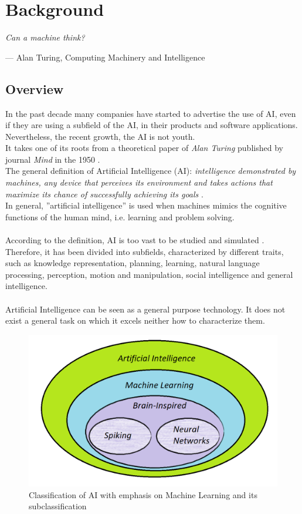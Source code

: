 \chapter{Background}

\epigraph{ \textit{Can a machine think?}}{--- \textup{Alan Turing}, Computing Machinery and Intelligence}

\section{Overview}
In the past decade many companies have started to advertise the use of AI, even if they are using a subfield of the AI, in their products and software applications. Nevertheless, the recent growth,
the AI is not youth.\\ It takes one of its roots from a theoretical paper of \textit{Alan Turing} published by journal \textit{Mind} in the 1950 \cite{paper:36}.\\

The general definition of Artificial Intelligence (AI): \textit{intelligence demonstrated by machines, any device that perceives its environment and takes actions that maximize its chance of successfully achieving its goals}    \cite{book:1}.\\ In general, ''artificial intelligence'' is used when machines mimics the cognitive functions of the human mind, i.e. learning and problem solving.\\\\
According to the definition, AI is too vast to be studied and simulated \cite{book:1}. Therefore, it has been divided into subfields, characterized by different traits, such as knowledge representation, planning, learning, natural language processing, perception, motion and manipulation, social intelligence and general intelligence.\\\\

Artificial Intelligence can be seen as a general purpose technology. It does not exist a general task on which it excels neither how to characterize them.

\begin{figure}[H]
\centering
\captionsetup{justification=centering}
\includegraphics[scale=0.5]{./figure/ai_division.png}
\caption{Classification of AI with emphasis on Machine Learning and its subclassification}
\label{fig:aidiv}
\end{figure}

